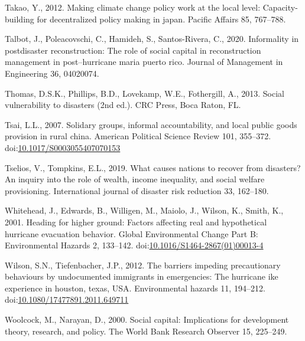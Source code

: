 \documentclass[]{elsarticle} %
\newlength{\cslhangindent}
\newlength{\cslentryspacingunit} %
\newenvironment{CSLReferences}[2] %
 {%
  \setlength{\parindent}{0pt}
  \ifodd #1
  \let\oldpar\par
  \def\par{\hangindent=\cslhangindent\oldpar}
  \fi
  \setlength{\parskip}{#2\cslentryspacingunit}
 }%
 {}
\begin{document}
\begin{CSLReferences}{1}{0}
\leavevmode{}%
Takao, Y., 2012. Making climate change policy work at the local level:
Capacity-building for decentralized policy making in japan. Pacific
Affairs 85, 767--788.

\leavevmode{}%
Talbot, J., Poleacovschi, C., Hamideh, S., Santos-Rivera, C., 2020.
Informality in postdisaster reconstruction: The role of social capital
in reconstruction management in post--hurricane maria puerto rico.
Journal of Management in Engineering 36, 04020074.

\leavevmode{}%
Thomas, D.S.K., Phillips, B.D., Lovekamp, W.E., Fothergill, A., 2013.
Social vulnerability to disasters (2nd ed.). CRC Press, Boca Raton, FL.

\leavevmode{}%
Tsai, L.L., 2007. Solidary groups, informal accountability, and local
public goods provision in rural china. American Political Science Review
101, 355--372.
doi:\href{https://doi.org/10.1017/S0003055407070153}{10.1017/S0003055407070153}

\leavevmode{}%
Tselios, V., Tompkins, E.L., 2019. What causes nations to recover from
disasters? An inquiry into the role of wealth, income inequality, and
social welfare provisioning. International journal of disaster risk
reduction 33, 162--180.

\leavevmode{}%
Whitehead, J., Edwards, B., Willigen, M., Maiolo, J., Wilson, K., Smith,
K., 2001. Heading for higher ground: Factors affecting real and
hypothetical hurricane evacuation behavior. Global Environmental Change
Part B: Environmental Hazards 2, 133--142.
doi:\href{https://doi.org/10.1016/S1464-2867(01)00013-4}{10.1016/S1464-2867(01)00013-4}

\leavevmode{}%
Wilson, S.N., Tiefenbacher, J.P., 2012. The barriers impeding
precautionary behaviours by undocumented immigrants in emergencies: The
hurricane ike experience in houston, texas, USA. Environmental hazards
11, 194--212.
doi:\href{https://doi.org/10.1080/17477891.2011.649711}{10.1080/17477891.2011.649711}

\leavevmode{}%
Woolcock, M., Narayan, D., 2000. Social capital: Implications for
development theory, research, and policy. The World Bank Research
Observer 15, 225--249.


\end{CSLReferences}
\end{document}
